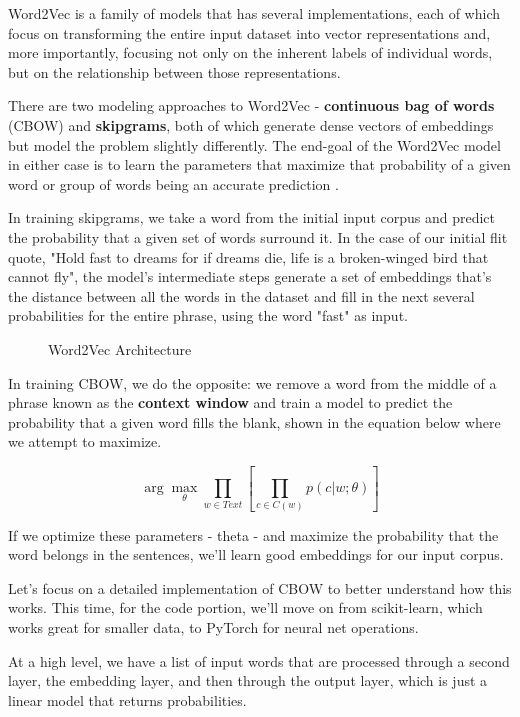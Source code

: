 \documentclass[11pt, table]{diazessay} %
\begin{document}
\begin{sloppypar}
Word2Vec is a family of models that has several implementations, each of which focus on transforming the entire input dataset into vector representations and, more importantly, focusing  not only on the inherent labels of individual words, but on the relationship between those representations.

There are two modeling approaches to Word2Vec - \textbf{continuous bag of words} (CBOW) and \textbf{skipgrams}, both of which generate dense vectors of embeddings but model the problem slightly differently. The end-goal of the Word2Vec model in either case is to learn the parameters that maximize that probability of a given word or group of words being an accurate prediction  \citep{goldberg2014word2vec}.

In training skipgrams, we take a word from the initial input corpus and predict the probability that a given set of words surround it. In the case of our initial flit quote, "Hold fast to dreams for if dreams die, life is a broken-winged bird that cannot fly", the model's intermediate steps generate a set of embeddings that's the distance between all the words in the dataset and fill in the next several probabilities for the entire phrase, using the word "fast" as input.  

\begin{figure}[H]
   	 \caption{Word2Vec Architecture}
      \end{figure}

In training CBOW, we do the opposite: we remove a word from the middle of a phrase known as the \textbf{context window} and train  a model to predict the probability that a given word fills the blank, shown in the equation below where we attempt to maximize.

\begin{equation}
\arg\max_\theta \prod_{w\in Text}\left[\prod_{c \in C(w)} p(c|w;\theta)\right]
\end{equation}

If we optimize these parameters - theta - and maximize the probability that the word belongs in the sentences, we'll learn good embeddings for our input corpus.

Let's focus on a detailed implementation of CBOW to better understand how this works. This time, for the code portion, we'll move on from scikit-learn, which works great for smaller data, to PyTorch for neural net operations.  

At a high level, we have a list of input words that are processed through a second layer, the embedding layer, and then through the output layer, which is just a linear model that returns probabilities.


\end{sloppypar}
\end{document}
